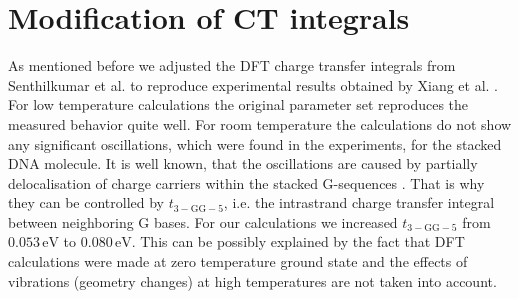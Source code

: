 \documentclass[reprint,superscriptaddress,nofootinbib,amsmath,amssymb,prb,floatfix]{revtex4-1}
\begin{document}
\section{Modification of CT integrals}
\label{mod}

As mentioned before we adjusted the DFT charge transfer integrals from Senthilkumar et
al. \cite{senthilkumar_absolute_2005} to reproduce experimental results obtained by Xiang et
al. \cite{xiang_intermediate_2015}. For low temperature calculations the original parameter set
reproduces the measured behavior quite well. For room temperature the calculations do not show any
significant oscillations, which were found in the experiments, for the stacked DNA molecule.  It is
well known, that the oscillations are caused by partially delocalisation of charge carriers within
the stacked G-sequences \cite{kim_intermediate_2016}. That is why they can be controlled by
$t_{3-\text{GG}-5}$, i.e. the intrastrand charge transfer integral between neighboring G bases. For
our calculations we increased $t_{3-\text{GG}-5}$ from $0.053\,\text{eV}$ to $0.080\,\text{eV}$.
This can be possibly explained by the fact that DFT calculations were made at zero temperature
ground state and the effects of vibrations (geometry changes) at high temperatures are not taken
into account. \\
\end{document}
